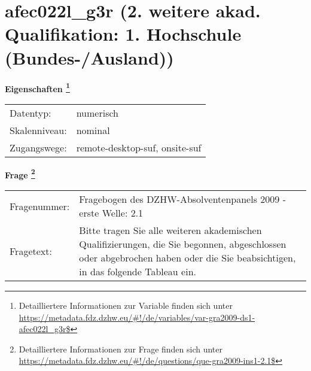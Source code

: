 
    \setcounter{footnote}{0}

    \vspace*{-1.8cm}
	\section{afec022l\_g3r (2. weitere akad. Qualifikation: 1. Hochschule (Bundes-/Ausland))}
	\label{section:afec022l_g3r}



    \vspace*{0.5cm}
    \noindent\textbf{Eigenschaften
	\footnote{Detailliertere Informationen zur Variable finden sich unter
		\url{https://metadata.fdz.dzhw.eu/\#!/de/variables/var-gra2009-ds1-afec022l_g3r$}}}\\
	\begin{tabularx}{\hsize}{@{}lX}
	Datentyp: & numerisch \\
	Skalenniveau: & nominal \\
	Zugangswege: &
	  remote-desktop-suf, 
	  onsite-suf
 \\
    \end{tabularx}



				\vspace*{0.5cm}
                \noindent\textbf{Frage
	                \footnote{Detailliertere Informationen zur Frage finden sich unter
		              \url{https://metadata.fdz.dzhw.eu/\#!/de/questions/que-gra2009-ins1-2.1$}}}\\
				\begin{tabularx}{\hsize}{@{}lX}
					Fragenummer: &
					  Fragebogen des DZHW-Absolventenpanels 2009 - erste Welle:
					  2.1
 \\
					Fragetext: & Bitte tragen Sie alle weiteren akademischen Qualifizierungen, die Sie begonnen, abgeschlossen oder abgebrochen haben oder die Sie beabsichtigen, in das folgende Tableau ein. \\
				\end{tabularx}






